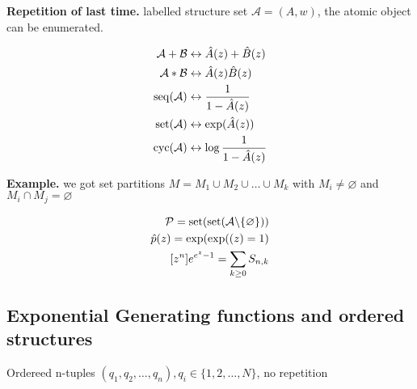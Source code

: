 

\textbf{Repetition of last time.}
labelled structure set $\mathcal{A} = (A,w)$, the atomic object can be enumerated. 

\begin{align*}
  \mathcal{A}+\mathcal{B} &\leftrightarrow \hat{A}(z) + \hat{B}(z) \\
  \mathcal{A}*\mathcal{B} &\leftrightarrow \hat{A}(z) \hat{B}(z) \\
  \operatorname{seq}(\mathcal{A}) &\leftrightarrow \frac{1}{1 - \hat{A}(z)}\\
  \operatorname{set}(\mathcal{A}) &\leftrightarrow \exp(\hat{A}(z)) \\
  \operatorname{cyc}(\mathcal{A}) &\leftrightarrow \log \frac{1}{1 - \hat{A}(z)}\\
\end{align*}



\textbf{Example.}
we got set partitions $M = M_1 \cup M_2 \cup \ldots \cup M_k$ with $M_i \neq \varnothing$ and $M_i \cap M_j = \varnothing$

\begin{align*}
  \mathcal{P} = \operatorname{set}( \operatorname{set}( \mathcal{A} \backslash \{\varnothing\} )) \\
  \hat{p}(z) = \exp(\exp((z) = 1) \\
  [z^n] e^{e^z - 1} = \sum_{k\geq 0 } S_{n,k} \\
\end{align*}

\subsection{Exponential Generating functions and ordered structures}

Ordereed n-tuples $(q_1,q_2, \ldots, q_n), q_i \in \{1,2, \ldots, N\}$, no repetition

